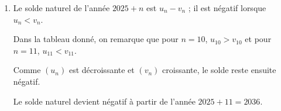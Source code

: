 \documentclass[10pt]{article}
\providecommand{\np}[2][]{{#2~#1}}
\begin{document}
\begin{enumerate}
\begin{enumerate}
		\item La ligne 12 correspond à $n = 10$ :
		$v_{10} = \np{40000} + 900 \times 10 = \np{49000}$.

		La cellule C12 affiche \np{49000}.
	\end{enumerate}

	\item Le solde naturel de l'année $2025+n$ est $u_n - v_n$ ; il est négatif lorsque $u_n < v_n$.

		Dans la tableau donné, on remarque que pour $n = 10$, $u_{10} > v_{10}$ et pour $n=11$, $u_{11} < v_{11}$.
	
	Comme $(u_n)$ est décroissante et $(v_n)$ croissante, le
	solde reste ensuite négatif.

	Le solde naturel devient négatif à partir de l'année
	$2025 + 11 = 2036$.
\end{enumerate}
\end{document}
